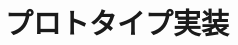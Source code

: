 \documentclass[submit,techrep,noauthor]{ipsj}
\def\|{\verb|}
\begin{document}
% \begin{itemize}
%  \item[$\Box$] 二重投稿はしてはならない ─ ただし国際会議に採択された論
% 	       文を著作権が問題にならないように投稿することは構わない．
%  \item[$\Box$] 他の論文とまったく同じ図表を引用の明示なしに利用すること
% 	       は禁止．
%  \item[$\Box$] 既発表の論文等との間に重複があるのは再考を要する．
% \end{itemize}

%5.6
% \subsection{他の人に読んでもらう}

% \begin{itemize}
%  \item[$\Box$] 投稿経験が少ない人は，採録された経験の豊富な人に校正して
% 	       もらう．
%  \item[$\Box$] 読者の立場から見て論理的な飛躍がないかに注意して記述する．
% \end{itemize}

%5.7
% \subsection{その他}

% \begin{itemize}
%  \item[$\Box$] 投稿前にチェックリストの各項目を満たしているか，必ず確認
% 	       する． 
% \end{itemize}

%6
\section{プロトタイプ実装}

% 本稿では，A4縦型2段組み用に変更したスタイルファイルを用いた論文のフォー
% マット方法と，論文誌ジャーナル編集委員会がまとめた「べからず集」に基づく
% 論文の書き方を示した．内容的にまだ不十分の部分が多いため，意見，要望等を
% \begin{quote}
%  \|editt@ipsj.or.jp|



\end{document}
